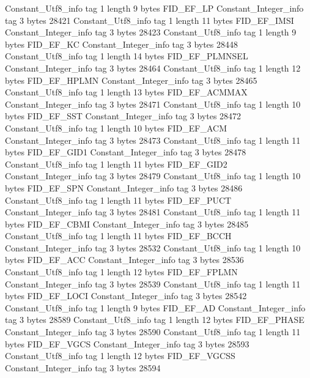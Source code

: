 {{		Constant_Utf8_info {
			tag	1
			length	9
			bytes	FID_EF_LP
		}
		Constant_Integer_info {
			tag	3
			bytes	28421
		}
		Constant_Utf8_info {
			tag	1
			length	11
			bytes	FID_EF_IMSI
		}
		Constant_Integer_info {
			tag	3
			bytes	28423
		}
		Constant_Utf8_info {
			tag	1
			length	9
			bytes	FID_EF_KC
		}
		Constant_Integer_info {
			tag	3
			bytes	28448
		}
		Constant_Utf8_info {
			tag	1
			length	14
			bytes	FID_EF_PLMNSEL
		}
		Constant_Integer_info {
			tag	3
			bytes	28464
		}
		Constant_Utf8_info {
			tag	1
			length	12
			bytes	FID_EF_HPLMN
		}
		Constant_Integer_info {
			tag	3
			bytes	28465
		}
		Constant_Utf8_info {
			tag	1
			length	13
			bytes	FID_EF_ACMMAX
		}
		Constant_Integer_info {
			tag	3
			bytes	28471
		}
		Constant_Utf8_info {
			tag	1
			length	10
			bytes	FID_EF_SST
		}
		Constant_Integer_info {
			tag	3
			bytes	28472
		}
		Constant_Utf8_info {
			tag	1
			length	10
			bytes	FID_EF_ACM
		}
		Constant_Integer_info {
			tag	3
			bytes	28473
		}
		Constant_Utf8_info {
			tag	1
			length	11
			bytes	FID_EF_GID1
		}
		Constant_Integer_info {
			tag	3
			bytes	28478
		}
		Constant_Utf8_info {
			tag	1
			length	11
			bytes	FID_EF_GID2
		}
		Constant_Integer_info {
			tag	3
			bytes	28479
		}
		Constant_Utf8_info {
			tag	1
			length	10
			bytes	FID_EF_SPN
		}
		Constant_Integer_info {
			tag	3
			bytes	28486
		}
		Constant_Utf8_info {
			tag	1
			length	11
			bytes	FID_EF_PUCT
		}
		Constant_Integer_info {
			tag	3
			bytes	28481
		}
		Constant_Utf8_info {
			tag	1
			length	11
			bytes	FID_EF_CBMI
		}
		Constant_Integer_info {
			tag	3
			bytes	28485
		}
		Constant_Utf8_info {
			tag	1
			length	11
			bytes	FID_EF_BCCH
		}
		Constant_Integer_info {
			tag	3
			bytes	28532
		}
		Constant_Utf8_info {
			tag	1
			length	10
			bytes	FID_EF_ACC
		}
		Constant_Integer_info {
			tag	3
			bytes	28536
		}
		Constant_Utf8_info {
			tag	1
			length	12
			bytes	FID_EF_FPLMN
		}
		Constant_Integer_info {
			tag	3
			bytes	28539
		}
		Constant_Utf8_info {
			tag	1
			length	11
			bytes	FID_EF_LOCI
		}
		Constant_Integer_info {
			tag	3
			bytes	28542
		}
		Constant_Utf8_info {
			tag	1
			length	9
			bytes	FID_EF_AD
		}
		Constant_Integer_info {
			tag	3
			bytes	28589
		}
		Constant_Utf8_info {
			tag	1
			length	12
			bytes	FID_EF_PHASE
		}
		Constant_Integer_info {
			tag	3
			bytes	28590
		}
		Constant_Utf8_info {
			tag	1
			length	11
			bytes	FID_EF_VGCS
		}
		Constant_Integer_info {
			tag	3
			bytes	28593
		}
		Constant_Utf8_info {
			tag	1
			length	12
			bytes	FID_EF_VGCSS
		}
		Constant_Integer_info {
			tag	3
			bytes	28594
		}
}}
